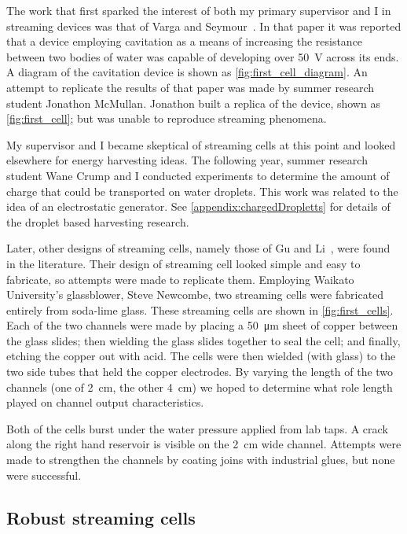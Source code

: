     The work that first sparked the interest of both my primary supervisor and I in streaming devices was that of Varga and Seymour~\cite{Varga1986}.
    In that paper it was reported that a device employing cavitation as a means of increasing the resistance between two bodies of  water was capable of developing over \SI{50}{\volt} across its ends.
    A diagram of the cavitation device is shown as \cref{fig:first_cell_diagram}.
    An attempt to replicate the results of that paper was made by summer research student Jonathon McMullan.
    Jonathon built a replica of the device, shown as \cref{fig:first_cell}; but was unable to reproduce streaming phenomena.

    My supervisor and I became skeptical of streaming cells at this point and looked elsewhere for energy harvesting ideas.
    The following year, summer research student Wane Crump and I conducted experiments to determine the amount of charge that could be transported on water droplets.
    This work was related to the idea of an electrostatic generator.
    See \cref{appendix:chargedDropletts} for details of the droplet based harvesting research.

    Later, other designs of streaming cells, namely those of Gu and Li~\cite{Gu2000}, were found in the literature.
    Their design of streaming cell looked simple and easy to fabricate, so attempts were made to replicate them.
    Employing Waikato University's glassblower, Steve Newcombe, two streaming cells were fabricated entirely from soda-lime glass.
    These streaming cells are shown in \cref{fig:first_cells}.
    Each of the two channels were made by placing a \SI{50}{\micro\meter} sheet of copper between the glass slides; then wielding the glass slides together to seal the cell; and finally, etching the copper out with acid.
    The cells were then wielded (with glass) to the two side tubes that held the copper electrodes.
    By varying the length of the two channels (one of \SI{2}{\centi\meter}, the other \SI{4}{\centi\meter}) we hoped to determine what role length played on channel output characteristics.

    Both of the cells burst under the water pressure applied from lab taps.
    A crack along the right hand reservoir is visible on the \SI{2}{\centi\meter} wide channel.
    Attempts were made to strengthen the channels by coating joins with industrial glues, but none were successful.


  \subsection{Robust streaming cells}


